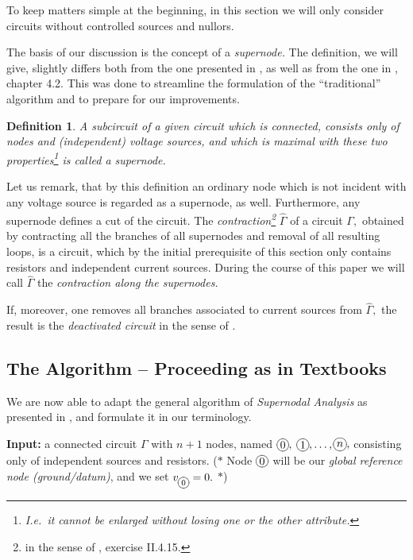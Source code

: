 \documentclass[10pt,journal,twocolumn,pagenumbers]{IEEEtran}
\newtheorem{definition}[theorem]{Definition}
\begin{document}
To keep matters simple at the beginning, in this section we will only consider circuits without controlled sources and nullors.

The basis of our discussion is the concept of a {\em super\-node.} The definition, we will give, slightly differs both from the one presented in \cite{SommerSuper}, as well as from the one in \cite{Davis}, chapter 4.2. This was done to streamline the formulation of the ``traditional'' algorithm and to prepare for our improvements.

\smallskip
\begin{definition}
\label{super1}
A subcircuit of a given circuit which is connected, consists only of nodes and (independent) voltage sources, and which is maximal with these two properties\footnote
{I.e.\ it cannot be enlarged without losing one or the other attribute.} is called a {\em supernode.}  
\end{definition}

\smallskip
Let us remark, that by this definition an ordinary node which is not incident with any voltage source is regarded as a supernode, as well. Furthermore, any super\-node defines a cut of the circuit. The {\em contraction\footnote
{in the sense of \cite{Bollobas}, exercise II.4.15.}
} $\widehat{\Gamma}$ of a circuit $\Gamma,$ obtained by contracting all the branches of all supernodes and removal of all resulting loops, is a circuit, which by the initial prerequisite of this section only contains resistors and independent current sources. During the course of this paper we will call $\widehat{\Gamma}$ the {\em contraction along the supernodes.}

If, moreover, one removes all branches associated to current sources from $\widehat{\Gamma},$ the result is the {\em deactivated circuit} in the sense of \cite{ChenDavis,Davis}.

\subsection{The Algorithm -- Proceeding as in Textbooks}

We are now able to adapt the general algorithm of {\em Super\-nodal Analysis} as presented in \cite{SommerSuper,ChenDavis,Davis}, and formulate it in our terminology.

\medskip
\noindent
{\bf Input:} a connected circuit $\Gamma$ with $n+1$ nodes, named ${\xy*+{0}*\cir{}\endxy},$ ${\xy*+{1}*\cir{}\endxy},\dots,$${\xy*+{n}*\cir{}\endxy},$ consisting only of independent sources and resistors. 
($*$ Node ${\xy*+{0}*\cir{}\endxy}$ will be our {\em global reference node (ground/datum)}, and we set $v_{\xy*+{\scriptstyle{0}}*\cir{}\endxy} = 0.$   $*$)
\end{document}
